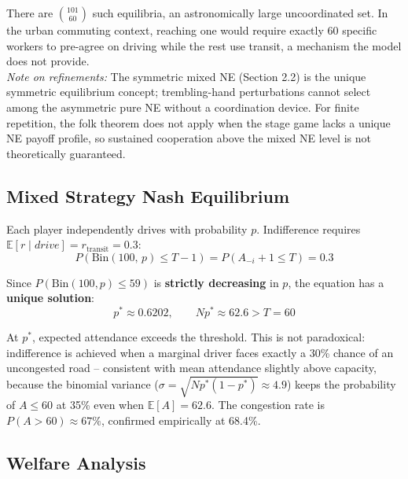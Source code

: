 \documentclass[letterpaper]{article}
\begin{document}
There are $\binom{101}{60}$ such equilibria, an astronomically large uncoordinated set. In the urban commuting context, reaching one would require exactly 60 specific workers to pre-agree on driving while the rest use transit, a mechanism the model does not provide. \\

\textit{Note on refinements:} The symmetric mixed NE (Section 2.2) is the unique symmetric equilibrium concept; trembling-hand perturbations cannot select among the asymmetric pure NE without a coordination device. For finite repetition, the folk theorem does not apply when the stage game lacks a unique NE payoff profile, so sustained cooperation above the mixed NE level is not theoretically guaranteed. \\

\subsection{Mixed Strategy Nash Equilibrium}

Each player independently drives with probability $p$. Indifference requires $\mathbb{E}[r \mid \textit{drive}] = r_{\text{transit}} = 0.3$: \\

\begin{equation}
P\!\left(\text{Bin}(100,\,p) \leq T{-}1\right) = P\!\left(A_{-i} + 1 \leq T\right) = 0.3
\end{equation}

Since $P(\text{Bin}(100, p) \leq 59)$ is \textbf{strictly decreasing} in $p$, the equation has a \textbf{unique solution}: \\

\begin{equation}
p^* \approx 0.6202, \qquad Np^* \approx 62.6 > T = 60
\end{equation}

At $p^*$, expected attendance exceeds the threshold. This is not paradoxical: indifference is achieved when a marginal driver faces exactly a 30\% chance of an uncongested road -- consistent with mean attendance slightly above capacity, because the binomial variance ($\sigma = \sqrt{Np^*(1-p^*)} \approx 4.9$) keeps the probability of $A \leq 60$ at 35\% even when $\mathbb{E}[A] = 62.6$. The congestion rate is $P(A > 60) \approx 67\%$, confirmed empirically at 68.4\%. \\

\subsection{Welfare Analysis}
\end{document}
